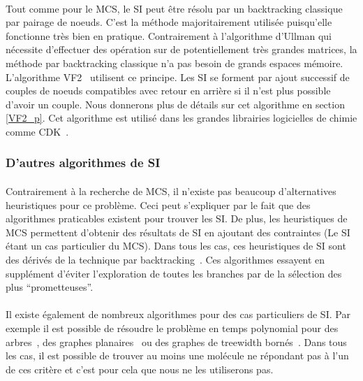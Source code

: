 \documentclass[12pt,french,twoside]{report}
\begin{document}
\paragraph{}Tout comme pour le MCS, le SI peut être résolu par un backtracking classique par pairage de noeuds.
C'est la méthode majoritairement utilisée puisqu'elle fonctionne très bien en pratique.
Contrairement à l'algorithme d'Ullman qui nécessite d'effectuer des opération sur de potentiellement très grandes matrices, la méthode par backtracking classique n'a pas besoin de grands espaces mémoire.
L'algorithme VF2~\cite{cordella_subgraph_2004} utilisent ce principe.
Les SI se forment par ajout successif de couples de noeuds compatibles avec retour en arrière si il n'est plus possible d'avoir un couple.
Nous donnerons plus de détails sur cet algorithme en section \ref{VF2_p}.
Cet algorithme est utilisé dans les grandes librairies logicielles de chimie comme CDK~\cite{steinbeck_chemistry_2003}.


\subsubsection{D'autres algorithmes de SI}

\paragraph{}Contrairement à la recherche de MCS, il n'existe pas beaucoup d'alternatives heuristiques pour ce problème.
Ceci peut s'expliquer par le fait que des algorithmes praticables existent pour trouver les SI.
De plus, les heuristiques de MCS permettent d'obtenir des résultats de SI en ajoutant des contraintes (Le SI étant un cas particulier du MCS).
Dans tous les cas, ces heuristiques de SI sont des dérivés de la technique par backtracking~\cite{kaijar_developing_2012}.
Ces algorithmes essayent en supplément d'éviter l'exploration de toutes les branches par de la sélection des plus ``prometteuses''.

\paragraph{}Il existe également de nombreux algorithmes pour des cas particuliers de SI.
Par exemple il est possible de résoudre le problème en temps polynomial pour des arbres~\cite{shamir_faster_1997}, des graphes planaires~\cite{eppstein_subgraph_1995,dorn_planar_2009} ou des graphes de treewidth bornés~\cite{hajiaghayi_subgraph_2007}.
Dans tous les cas, il est possible de trouver au moins une molécule ne répondant pas à l'un de ces critère et c'est pour cela que nous ne les utiliserons pas.
\end{document}
